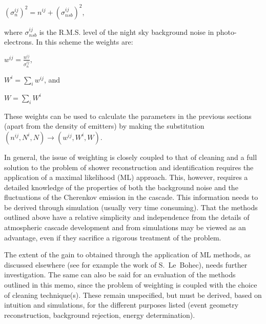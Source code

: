 \documentclass[letterpaper]{article}
\begin{document}
$\displaystyle (\sigma_n^{ij})^2 = n^{ij} + (\sigma_{nsb}^{ij})^2$,

where $\sigma_{nsb}^{ij}$ is the R.M.S. level of the night sky
background noise in photo-electrons. In this scheme the weights are:

$\displaystyle w^{ij} = \frac{n^{ij}}{\sigma_n^{ij}}$,

$\displaystyle W^i = \sum\limits_i w^{ij}$, and

$\displaystyle W = \sum\limits_i W^i$

These weights can be used to calculate the parameters in the previous
sections (apart from the density of emitters) by making the
substitution $(n^{ij}, N^i, N)\rightarrow(w^{ij},W^i,W)$.

In general, the issue of weighting is closely coupled to that of
cleaning and a full solution to the problem of shower reconstruction
and identification requires the application of a maximal likelihood
(ML) approach. This, however, requires a detailed knowledge of the
properties of both the background noise and the fluctuations of the
Cherenkov emission in the cascade. This information needs to be
derived through simulation (usually very time consuming). That the
methods outlined above have a relative simplicity and independence
from the details of atmospheric cascade development and from
simulations may be viewed as an advantage, even if they sacrifice
a rigorous treatment of the problem.

The extent of the gain to obtained through the application of ML
methods, as discussed elsewhere (see for example the work of
S.~Le~Bohec), needs further investigation. The same can also be said
for an evaluation of the methods outlined in this memo, since the
problem of weighting is coupled with the choice of cleaning
technique(s). These remain unspecified, but must be derived, based on
intuition and simulations, for the different purposes listed (event
geometry reconstruction, background rejection, energy determination).
\end{document}
